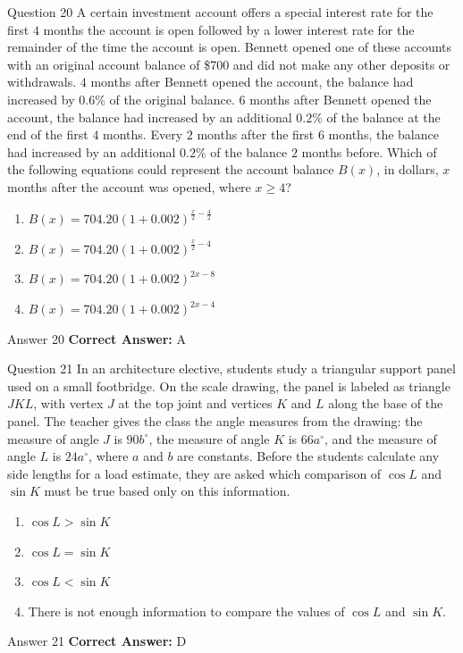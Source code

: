 \documentclass{beamer}
\begin{document}
\begin{frame}{Question 20}
\small
A certain investment account offers a special interest rate for the first \(4\) months the account is open followed by a lower interest rate for the remainder of the time the account is open. Bennett opened one of these accounts with an original account balance of \$700 and did not make any other deposits or withdrawals. \(4\) months after Bennett opened the account, the balance had increased by \(0.6\%\) of the original balance. \(6\) months after Bennett opened the account, the balance had increased by an additional \(0.2\%\) of the balance at the end of the first \(4\) months. Every \(2\) months after the first \(6\) months, the balance had increased by an additional \(0.2\%\) of the balance \(2\) months before. Which of the following equations could represent the account balance \(B(x)\), in dollars, \(x\) months after the account was opened, where \(x \ge 4\)?
\vspace{0.35cm}
\begin{enumerate}
    \item[A.] \(B(x) = 704.20(1 + 0.002)^{\frac{x}{2} - \frac{4}{2}}\)
    \item[B.] \(B(x) = 704.20(1 + 0.002)^{\frac{x}{2} - 4}\)
    \item[C.] \(B(x) = 704.20(1 + 0.002)^{2x - 8}\)
    \item[D.] \(B(x) = 704.20(1 + 0.002)^{2x - 4}\)
\end{enumerate}
\end{frame}
\begin{frame}{Answer 20}
\small
\textbf{Correct Answer:} A
\end{frame}

\begin{frame}{Question 21}
\small
In an architecture elective, students study a triangular support panel used on a small footbridge. On the scale drawing, the panel is labeled as triangle \(JKL\), with vertex \(J\) at the top joint and vertices \(K\) and \(L\) along the base of the panel. The teacher gives the class the angle measures from the drawing: the measure of angle \(J\) is \(90b^{\circ}\), the measure of angle \(K\) is \(66a^{\circ}\), and the measure of angle \(L\) is \(24a^{\circ}\), where \(a\) and \(b\) are constants. Before the students calculate any side lengths for a load estimate, they are asked which comparison of \(\cos L\) and \(\sin K\) must be true based only on this information.
\vspace{0.35cm}
\begin{enumerate}
    \item[A.] \(\cos L > \sin K\)
    \item[B.] \(\cos L = \sin K\)
    \item[C.] \(\cos L < \sin K\)
    \item[D.] There is not enough information to compare the values of \(\cos L\) and \(\sin K\).
\end{enumerate}
\end{frame}
\begin{frame}{Answer 21}
\small
\textbf{Correct Answer:} D
\end{frame}
\end{document}
